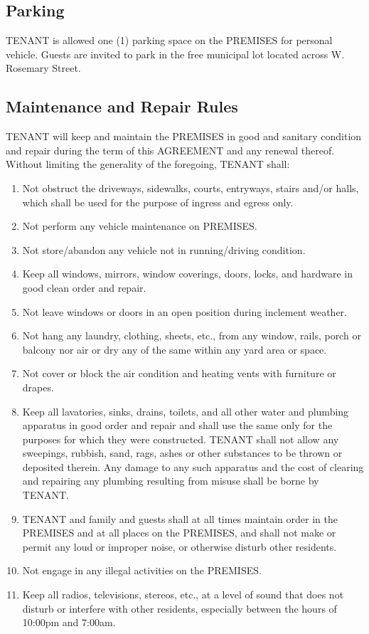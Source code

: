 \documentclass[11pt]{article}
\begin{document}
\subsection*{Parking}
\label{sec:org2d0c92a}
TENANT is allowed one (1) parking space on the PREMISES for personal
vehicle.  Guests are invited to park in the free municipal lot located
across W. Rosemary Street.

\subsection*{Maintenance and Repair Rules}
\label{sec:org3e3b90e}
TENANT will keep and maintain the PREMISES in good and sanitary
condition and repair during the term of this AGREEMENT and any renewal
thereof.  Without limiting the generality of the foregoing, TENANT
shall:

\begin{enumerate}
\item Not obstruct the driveways, sidewalks, courts, entryways, stairs
and/or halls, which shall be used for the purpose of ingress and
egress only.
\item Not perform any vehicle maintenance on PREMISES.
\item Not store/abandon any vehicle not in running/driving condition.
\item Keep all windows, mirrors, window coverings, doors, locks, and
hardware in good clean order and repair.
\item Not leave windows or doors in an open position during inclement weather.
\item Not hang any laundry, clothing, sheets, etc., from any window,
rails, porch or balcony nor air or dry any of the same within any
yard area or space.
\item Not cover or block the air condition and heating vents with
furniture or drapes.
\item Keep all lavatories, sinks, drains, toilets, and all other water
and plumbing apparatus in good order and repair and shall use the
same only for the purposes for which they were constructed.  TENANT
shall not allow any sweepings, rubbish, sand, rags, ashes or other
substances to be thrown or deposited therein.  Any damage to any
such apparatus and the cost of clearing and repairing any plumbing
resulting from misuse shall be borne by TENANT.
\item TENANT and family and guests shall at all times maintain order in
the PREMISES and at all places on the PREMISES, and shall not make
or permit any loud or improper noise, or otherwise disturb other
residents.
\item Not engage in any illegal activities on the PREMISES.
\item Keep all radios, televisions, stereos, etc., at a level of sound
that does not disturb or interfere with other residents,
especially between the hours of 10:00pm and 7:00am.
\end{enumerate}
\end{document}
